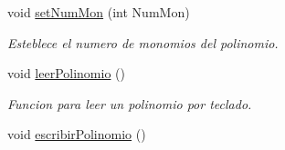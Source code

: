 \begin{DoxyCompactItemize}
void \hyperlink{classed_1_1Polinomio_ac97fa359ea885e984e0e69f69155d89a}{set\+Num\+Mon} (int Num\+Mon)
\begin{DoxyCompactList}\small\item\em Esteblece el numero de monomios del polinomio. \end{DoxyCompactList}\item 
void \hyperlink{classed_1_1Polinomio_ada80935d3e99914906c46592d6efdcd4}{leer\+Polinomio} ()
\begin{DoxyCompactList}\small\item\em Funcion para leer un polinomio por teclado. \end{DoxyCompactList}\item 
\hypertarget{classed_1_1Polinomio_ad8c9a4ff8fd9253e42dfaa4a6ced9409}{}void \hyperlink{classed_1_1Polinomio_ad8c9a4ff8fd9253e42dfaa4a6ced9409}{escribir\+Polinomio} ()\label{classed_1_1Polinomio_ad8c9a4ff8fd9253e42dfaa4a6ced9409}


\end{DoxyCompactItemize}
